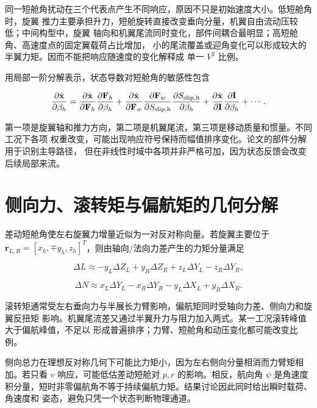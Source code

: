 \documentclass[UTF8,12pt,oneside,openany,fontset=windows]{ctexbook}
\begin{document}
同一短舱角扰动在三个代表点产生不同响应，原因不只是初始速度大小。低短舱角时，旋翼 推力主要承担升力，短舱旋转直接改变垂向分量，机翼自由流动压较低；中间构型中，旋翼 轴向和机翼尾流同时变化，部件间耦合最明显；高短舱角、高速度点的固定翼载荷占比增加， 小的尾流覆盖或迎角变化可以形成较大的半翼力矩。因而不能把响应随速度的变化解释成 单一 \(V^2\) 比例。

用局部一阶分解表示，状态导数对短舱角的敏感性包含

\begin{equation}
\frac{\partial\dot{\mathbf x}}{\partial\beta_h}
=\frac{\partial\dot{\mathbf x}}{\partial\mathbf F_h}
\frac{\partial\mathbf F_h}{\partial\beta_h}
+\frac{\partial\dot{\mathbf x}}{\partial\mathbf F_w}
\frac{\partial\mathbf F_w}{\partial S_{\rm slip,h}}
\frac{\partial S_{\rm slip,h}}{\partial\beta_h}
+\frac{\partial\dot{\mathbf x}}{\partial\mathbf I}
\frac{\partial\mathbf I}{\partial\beta_h}+\cdots .
\end{equation}

第一项是旋翼轴和推力方向，第二项是机翼尾流，第三项是移动质量和惯量。不同工况下各项 权重改变，可能出现响应符号保持而幅值排序变化。论文的部件分解用于识别主导路径， 但在非线性时域中各项并非严格可加，因为状态反馈会改变后续局部来流。

\section{侧向力、滚转矩与偏航矩的几何分解}

差动短舱角使左右旋翼力增量近似为一对反对称向量。若旋翼主要位于 \(\mathbf r_{L,R}=[x_h,\mp y_h,z_h]^T\)，则由轴向/法向力差产生的力矩分量满足

\begin{equation}
\Delta L\approx-y_L\Delta Z_L+y_R\Delta Z_R
+z_L\Delta Y_L-z_R\Delta Y_R,
\end{equation}

\begin{equation}
\Delta N\approx x_L\Delta Y_L-x_R\Delta Y_R
-y_L\Delta X_L+y_R\Delta X_R.
\end{equation}

滚转矩通常受左右垂向力与半展长力臂影响，偏航矩同时受轴向力差、侧向力和旋翼反扭矩 影响。机翼尾流差又通过半翼升力与阻力加入两式。某一工况滚转峰值大于偏航峰值，不足以 形成普遍排序；力臂、短舱角和动压变化都可能改变比例。

侧向总力在理想反对称几何下可能比力矩小，因为左右侧向分量相消而力臂矩相加。若只看 \(v\) 响应，可能低估差动短舱对 \(p,r\) 的影响。相反，航向角 \(\psi\) 是角速度 积分量，短时非零偏航角不等于持续偏航力矩。结果讨论因此同时给出瞬时载荷、角速度和 姿态，避免只凭一个状态判断物理通道。
\end{document}

